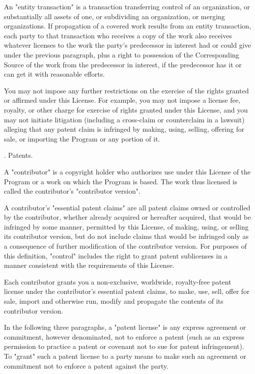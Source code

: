 An "entity transaction" is a transaction transferring control of an
organization, or substantially all assets of one, or subdividing an
organization, or merging organizations.  If propagation of a covered
work results from an entity transaction, each party to that
transaction who receives a copy of the work also receives whatever
licenses to the work the party's predecessor in interest had or could
give under the previous paragraph, plus a right to possession of the
Corresponding Source of the work from the predecessor in interest, if
the predecessor has it or can get it with reasonable efforts.

You may not impose any further restrictions on the exercise of the
rights granted or affirmed under this License.  For example, you may
not impose a license fee, royalty, or other charge for exercise of
rights granted under this License, and you may not initiate litigation
(including a cross-claim or counterclaim in a lawsuit) alleging that
any patent claim is infringed by making, using, selling, offering for
sale, or importing the Program or any portion of it.

. Patents.

A "contributor" is a copyright holder who authorizes use under this
License of the Program or a work on which the Program is based.  The
work thus licensed is called the contributor's "contributor version".

A contributor's "essential patent claims" are all patent claims
owned or controlled by the contributor, whether already acquired or
hereafter acquired, that would be infringed by some manner, permitted
by this License, of making, using, or selling its contributor version,
but do not include claims that would be infringed only as a
consequence of further modification of the contributor version.  For
purposes of this definition, "control" includes the right to grant
patent sublicenses in a manner consistent with the requirements of
this License.

Each contributor grants you a non-exclusive, worldwide, royalty-free
patent license under the contributor's essential patent claims, to
make, use, sell, offer for sale, import and otherwise run, modify and
propagate the contents of its contributor version.

In the following three paragraphs, a "patent license" is any express
agreement or commitment, however denominated, not to enforce a patent
(such as an express permission to practice a patent or covenant not to
sue for patent infringement).  To "grant" such a patent license to a
party means to make such an agreement or commitment not to enforce a
patent against the party.

